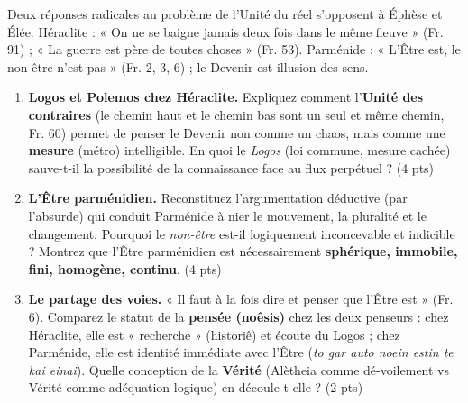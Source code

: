 \documentclass[11pt]{article}
\begin{document}
\begin{exercice}
Deux réponses radicales au problème de l'Unité du réel s'opposent à Éphèse et Élée. Héraclite : « On ne se baigne jamais deux fois dans le même fleuve » (Fr. 91) ; « La guerre est père de toutes choses » (Fr. 53). Parménide : « L'Être est, le non-être n'est pas » (Fr. 2, 3, 6) ; le Devenir est illusion des sens.

\begin{enumerate}
    \item \textbf{Logos et Polemos chez Héraclite.} Expliquez comment l'\textbf{Unité des contraires} (le chemin haut et le chemin bas sont un seul et même chemin, Fr. 60) permet de penser le Devenir non comme un chaos, mais comme une \textbf{mesure} (métro) intelligible. En quoi le \textit{Logos} (loi commune, mesure cachée) sauve-t-il la possibilité de la connaissance face au flux perpétuel ? (4 pts)
    \item \textbf{L'Être parménidien.} Reconstituez l'argumentation déductive (par l'absurde) qui conduit Parménide à nier le mouvement, la pluralité et le changement. Pourquoi le \textit{non-être} est-il logiquement inconcevable et indicible ? Montrez que l'Être parménidien est nécessairement \textbf{sphérique, immobile, fini, homogène, continu}. (4 pts)
    \item \textbf{Le partage des voies.} « Il faut à la fois dire et penser que l'Être est » (Fr. 6). Comparez le statut de la \textbf{pensée (noêsis)} chez les deux penseurs : chez Héraclite, elle est « recherche » (historiê) et écoute du Logos ; chez Parménide, elle est identité immédiate avec l'Être (\textit{to gar auto noein estin te kai einai}). Quelle conception de la \textbf{Vérité} (Alètheia comme dé-voilement vs Vérité comme adéquation logique) en découle-t-elle ? (2 pts)
\end{enumerate}
\end{exercice}
\end{document}
